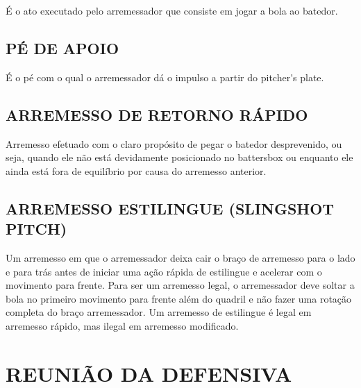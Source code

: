 É o ato executado pelo arremessador que consiste em jogar a bola ao batedor.

\subsection{PÉ DE APOIO}

É o pé com o qual o arremessador dá o impulso a partir do \gls{pitcher's plate}.

\subsection{ARREMESSO DE RETORNO RÁPIDO}

Arremesso efetuado com o claro propósito de pegar o batedor desprevenido, ou seja, quando ele não está devidamente posicionado no \gls{battersbox} ou enquanto ele ainda está fora de equilíbrio por causa do arremesso anterior.

\subsection{ARREMESSO ESTILINGUE (SLINGSHOT PITCH)}

 Um arremesso em que o arremessador deixa cair o braço de arremesso para o lado e para trás antes de iniciar uma ação rápida de estilingue e acelerar com o movimento para frente. Para ser um arremesso legal, o arremessador deve soltar a bola no primeiro movimento para frente além do quadril e não fazer uma  rotação completa do braço arremessador. Um arremesso de estilingue é legal em arremesso rápido, mas ilegal em arremesso modificado.

 \section{REUNIÃO DA DEFENSIVA}
